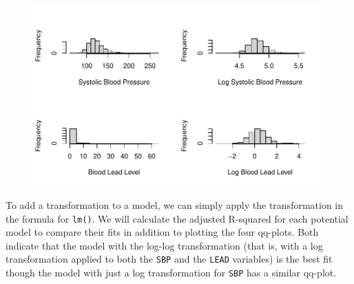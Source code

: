 \documentclass[
  letterpaper,
]{krantz}
\makeatletter
\newenvironment{Shaded}{\begin{snugshade}}{\end{snugshade}}
\newcommand{\AttributeTok}[1]{\textcolor[rgb]{0.40,0.45,0.13}{#1}}
\newcommand{\DecValTok}[1]{\textcolor[rgb]{0.68,0.00,0.00}{#1}}
\newcommand{\FunctionTok}[1]{\textcolor[rgb]{0.28,0.35,0.67}{#1}}
\newcommand{\NormalTok}[1]{\textcolor[rgb]{0.00,0.23,0.31}{#1}}
\newcommand{\SpecialCharTok}[1]{\textcolor[rgb]{0.37,0.37,0.37}{#1}}
\newcommand{\StringTok}[1]{\textcolor[rgb]{0.13,0.47,0.30}{#1}}
\newenvironment{kframe}{%
\medskip{}
\setlength{\fboxsep}{.8em}
 \def\at@end@of@kframe{}%
 \ifinner\ifhmode%
  \def\at@end@of@kframe{\end{minipage}}%
  \begin{minipage}{\columnwidth}%
 \fi\fi%
 \def\FrameCommand##1{\hskip\@totalleftmargin \hskip-\fboxsep
 \colorbox{shadecolor}{##1}\hskip-\fboxsep
     \hskip-\linewidth \hskip-\@totalleftmargin \hskip\columnwidth}%
 \MakeFramed {\advance\hsize-\width
   \@totalleftmargin\z@ \linewidth\hsize
   \@setminipage}}%
 {\par\unskip\endMakeFramed%
 \at@end@of@kframe}
\renewenvironment{Shaded}{\begin{kframe}}{\end{kframe}}
\makeatother
\begin{document}
\begin{Shaded}
\end{Shaded}

\begin{figure}[H]

{\centering \includegraphics[width=1\textwidth,height=\textheight]{book/10_linear_regression_files/figure-pdf/unnamed-chunk-24-1.pdf}

}

\end{figure}

To add a transformation to a model, we can simply apply the
transformation in the formula for \texttt{lm()}. We will calculate the
adjusted R-squared for each potential model to compare their fits in
addition to plotting the four qq-plots. Both indicate that the model
with the log-log transformation (that is, with a log transformation
applied to both the \texttt{SBP} and the \texttt{LEAD} variables) is the
best fit though the model with just a log transformation for
\texttt{SBP} has a similar qq-plot.
\end{document}
